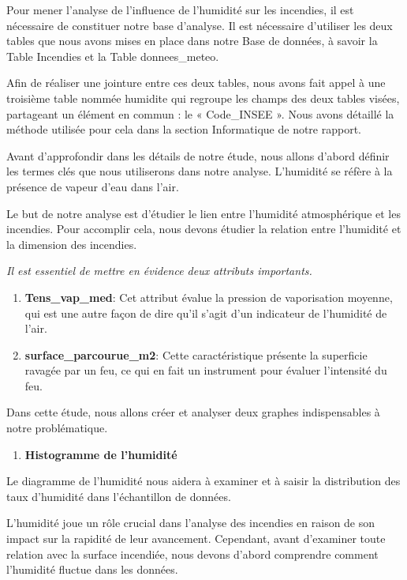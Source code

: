 \documentclass[
]{article}
\providecommand{\tightlist}{%
  \setlength{\itemsep}{0pt}\setlength{\parskip}{0pt}}
\begin{document}
Pour mener l'analyse de l'influence de l'humidité sur les incendies, il
est nécessaire de constituer notre base d'analyse. Il est nécessaire
d'utiliser les deux tables que nous avons mises en place dans notre Base
de données, à savoir la Table Incendies et la Table donnees\_meteo.

Afin de réaliser une jointure entre ces deux tables, nous avons fait
appel à une troisième table nommée humidite qui regroupe les champs des
deux tables visées, partageant un élément en commun : le « Code\_INSEE
». Nous avons détaillé la méthode utilisée pour cela dans la section
Informatique de notre rapport.

Avant d'approfondir dans les détails de notre étude, nous allons d'abord
définir les termes clés que nous utiliserons dans notre analyse.
L'humidité se réfère à la présence de vapeur d'eau dans l'air.

Le but de notre analyse est d'étudier le lien entre l'humidité
atmosphérique et les incendies. Pour accomplir cela, nous devons étudier
la relation entre l'humidité et la dimension des incendies.

\emph{Il est essentiel de mettre en évidence deux attributs importants.}

\begin{enumerate}
\def\labelenumi{\arabic{enumi}.}
\item
  \textbf{Tens\_vap\_med}: Cet attribut évalue la pression de
  vaporisation moyenne, qui est une autre façon de dire qu'il s'agit
  d'un indicateur de l'humidité de l'air.
\item
  \textbf{surface\_parcourue\_m2}: Cette caractéristique présente la
  superficie ravagée par un feu, ce qui en fait un instrument pour
  évaluer l'intensité du feu.
\end{enumerate}

Dans cette étude, nous allons créer et analyser deux graphes
indispensables à notre problématique.

\begin{enumerate}
\def\labelenumi{\arabic{enumi}.}
\tightlist
\item
  \textbf{Histogramme de l'humidité}
\end{enumerate}

Le diagramme de l'humidité nous aidera à examiner et à saisir la
distribution des taux d'humidité dans l'échantillon de données.

L'humidité joue un rôle crucial dans l'analyse des incendies en raison
de son impact sur la rapidité de leur avancement. Cependant, avant
d'examiner toute relation avec la surface incendiée, nous devons d'abord
comprendre comment l'humidité fluctue dans les données.
\end{document}
